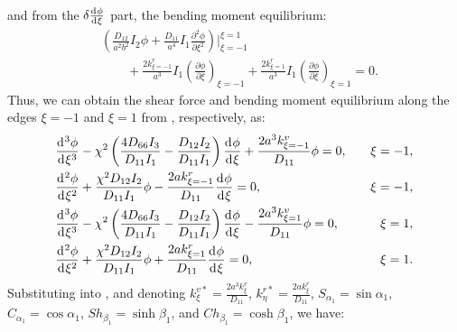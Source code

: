 \documentclass[preprint,12pt]{elsarticle}
\newcommand{\id}{\mathrm{d}\mkern1mu}
\begin{document}
%
and from the $\delta \frac{\id \phi}{\id \xi}$ part, the bending moment equilibrium:
%
\begin{equation}\label{eq:inertial_forcex2}
	\begin{split}	
		&\left( \frac{D_{12}}{a^2b^2} I_2 \phi + \frac{D_{11}}{a^4} I_1 \frac{\partial^2 \phi}{\partial \xi^2} \right) 
		\Big|^{\xi=1}_{\xi=-1} \\
		&\qquad + \frac{2k^r_{\xi=-1}}{a^3} I_1 \left(\frac{\partial \phi}{\partial \xi}\right)_{\xi=-1}
		+ \frac{2k^r_{\xi=1}}{a^3} I_1 \left(\frac{\partial \phi}{\partial \xi}\right)_{\xi=1} = 0.
	\end{split}
\end{equation}
%
Thus, we can obtain the shear force and bending moment equilibrium along the edges $\xi = -1$ and $\xi = 1$ from , respectively, as:
%
\begin{subequations}\label{eq:boundaryx}
	\begin{align}
		&  \frac{\id^3 \phi}{\id \xi^3} - \chi^2\left( \frac{4D_{66}I_3}{D_{11}I_1}  - \frac{D_{12}I_2}{D_{11}I_1}  \right) \frac{\id \phi}{\id \xi} 
		+\frac{2a^3k^v_{\xi=-1}}{D_{11}}\phi = 0, \quad &\xi = -1, \\
		& \frac{\id^2 \phi}{\id \xi^2} + \frac{\chi^2 D_{12} I_2}{D_{11} I_1} \phi - \frac{2a k^r_{\xi=-1}}{D_{11}} \frac{\id \phi}{\id \xi} = 0, \quad &\xi = -1, \\
		& \frac{\id^3 \phi}{\id \xi^3} - \chi^2\left( \frac{4D_{66}I_3}{D_{11}I_1}  - \frac{D_{12}I_2}{D_{11}I_1}  \right) \frac{\id \phi}{\id \xi} 
		-\frac{2a^3 k^v_{\xi=1}}{D_{11}} \phi = 0, \quad &\xi = 1, \\
		& \frac{\id^2 \phi}{\id \xi^2} + \frac{\chi^2 D_{12} I_2}{D_{11} I_1} \phi + \frac{2a k^r_{\xi=1}}{D_{11}} \frac{\id \phi}{\id \xi} = 0, \quad &\xi = 1.
	\end{align}
\end{subequations}
%
Substituting  into , and denoting $k^{v*}_{\xi} = \frac{2a^3 k^v_{\xi}}{D_{11}} $, 
$ k^{r*}_{\eta} = \frac{2a k^r_{\xi}}{D_{11}} $, $ S_{\alpha_1} = \sin \alpha_1 $, $ C_{\alpha_1} =\cos \alpha_1 $, $ Sh_{\beta_1} = \sinh \beta_1$, and $ Ch_{\beta_1} = \cosh \beta_1 $, we have:
%
\end{document}
